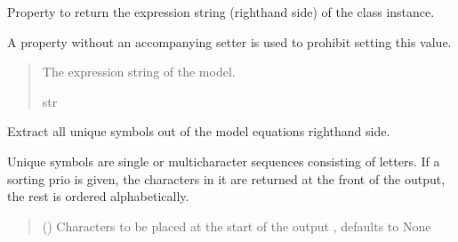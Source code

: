 \documentclass[letterpaper,10pt,english]{sphinxmanual}
\begin{document}
\begin{fulllineitems}
\begin{fulllineitems}
\label{\detokenize{VPCModel:src.VPCModel.VPCModel.expression_string}}
\pysigstartsignatures
{}
\pysigstopsignatures
\sphinxAtStartPar
Property to return the expression string (right\sphinxhyphen{}hand side) of the class instance.

\sphinxAtStartPar
A property without an accompanying setter is used to prohibit setting this value.
\begin{quote}\begin{description}
\sphinxAtStartPar
The expression string of the model.

\sphinxAtStartPar
str

\end{description}\end{quote}

\end{fulllineitems}


\begin{fulllineitems}
\label{\detokenize{VPCModel:src.VPCModel.VPCModel.extract_symbols}}
\pysigstartsignatures
{}
\pysigstopsignatures
\sphinxAtStartPar
Extract all unique symbols out of the model equations right\sphinxhyphen{}hand side.

\sphinxAtStartPar
Unique symbols are single or multi\sphinxhyphen{}character sequences consisting of letters.
If a sorting prio is given, the characters in it are returned at the front of the output,
the rest is ordered alphabetically.
\begin{quote}\begin{description}
\sphinxAtStartPar
{} (\sphinxstyleliteralemphasis{\sphinxupquote{{[}}}\sphinxstyleliteralemphasis{\sphinxupquote{{]} }}\sphinxstyleliteralemphasis{\sphinxupquote{| }}\sphinxstyleliteralemphasis{\sphinxupquote{, }}) \textendash{} Characters to be placed at the start of the output , defaults to None


\end{description}
\end{quote}
\end{fulllineitems}
\end{fulllineitems}
\end{document}
